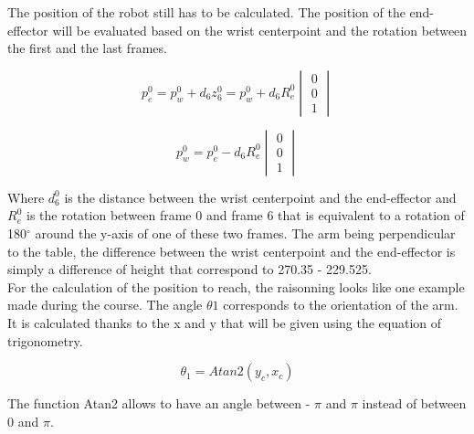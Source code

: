 \noindent The position of the robot still has to be calculated. The position of the end-effector will be evaluated based on the wrist centerpoint and the rotation between the first and the last frames. \\

\begin{center}
	\begin{equation}
		p^0_e = p^0_w + d_6 z ^0_6 = p^0_w + d_6 R_e^0 \begin{vmatrix}
		0 \\ 0 \\ 1
		\end{vmatrix}
	\end{equation}
\end{center}

\begin{center}
	\begin{equation}
		p^0_w = p^0_e - d_6 R_e^0 \begin{vmatrix}
		0 \\ 0 \\ 1
		\end{vmatrix}
	\end{equation}
\end{center}

\noindent Where $d_6^0$ is the distance between the wrist centerpoint and the end-effector and $R^0_e$ is the rotation between frame 0 and frame 6 that is equivalent to a rotation of 180$^\circ$ around the y-axis of one of these two frames. The arm being perpendicular to the table, the difference between the wrist centerpoint and the end-effector is simply a difference of height that correspond to 270.35 - 229.525. \\


\noindent For the calculation of the position to reach, the raisonning looks like one example made during the course. The angle $\theta1$ corresponds to the orientation of the arm. It is calculated thanks to the x and y that will be given using the equation of trigonometry.\\

\begin{center}
	\begin{equation}
		\theta_1 = Atan2(y_c,x_c)
	\end{equation}
\end{center}

\noindent The function Atan2 allows to have an angle between - $\pi$ and $\pi$ instead of between 0 and $\pi$.\\

